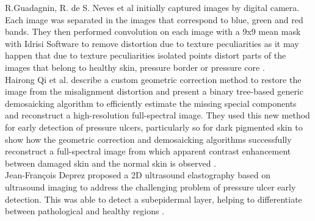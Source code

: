 \indent R.Guadagnin, R. de S. Neves et al initially captured images by digital camera. Each image was separated in the images that correspond to blue, green and red bands. They then performed convolution on each image with a 9x9 mean mask with Idrisi Software to remove distortion due to texture peculiarities as it may happen that due to texture peculiarities isolated points distort parts of the images that belong to healthy skin, pressure border or pressure core \cite{Santana}. \\
\indent Hairong Qi et al. describe a custom geometric correction method to restore the image from the misalignment distortion and present a binary tree-based generic demosaicking algorithm to efficiently estimate the missing special components
and reconstruct a high-resolution full-spectral image. They used this new method for early detection of pressure ulcers, particularly so for dark pigmented skin to show how the geometric correction and demosaicking algorithms successfully reconstruct a full-spectral image from which apparent contrast enhancement between damaged skin and the normal skin is observed \cite{Qi}.\\
\indent Jean-François Deprez proposed a 2D ultrasound elastography based on ultrasound imaging to address the challenging problem of pressure ulcer early detection. This was able to detect a subepidermal layer, helping to differentiate between pathological and healthy regions \cite{Deprez}. \\